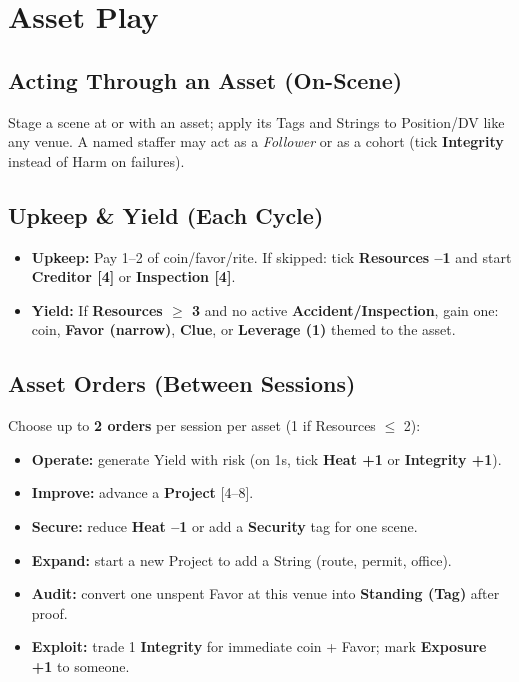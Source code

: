   \section{Asset Play}
  \subsection{Acting Through an Asset (On-Scene)}
  Stage a scene at or with an asset; apply its Tags and Strings to Position/DV like any venue. A named staffer may act as a \emph{Follower} or as a cohort (tick \textbf{Integrity} instead of Harm on failures).
  
  \subsection{Upkeep \& Yield (Each Cycle)}
  \begin{itemize}
    \item \textbf{Upkeep:} Pay 1--2 of coin/favor/rite. If skipped: tick \textbf{Resources --1} and start \textbf{Creditor [4]} or \textbf{Inspection [4]}.
    \item \textbf{Yield:} If \textbf{Resources $\geq$ 3} and no active \textbf{Accident/Inspection}, gain one: coin, \textbf{Favor (narrow)}, \textbf{Clue}, or \textbf{Leverage (1)} themed to the asset.
  \end{itemize}
  
  \subsection{Asset Orders (Between Sessions)}
  Choose up to \textbf{2 orders} per session per asset (1 if Resources $\leq$ 2):
  \begin{itemize}
    \item \textbf{Operate:} generate Yield with risk (on 1s, tick \textbf{Heat +1} or \textbf{Integrity +1}).
    \item \textbf{Improve:} advance a \textbf{Project} [4--8].
    \item \textbf{Secure:} reduce \textbf{Heat --1} or add a \textbf{Security} tag for one scene.
    \item \textbf{Expand:} start a new Project to add a String (route, permit, office).
    \item \textbf{Audit:} convert one unspent Favor at this venue into \textbf{Standing (Tag)} after proof.
    \item \textbf{Exploit:} trade 1 \textbf{Integrity} for immediate coin + Favor; mark \textbf{Exposure +1} to someone.
  \end{itemize}
